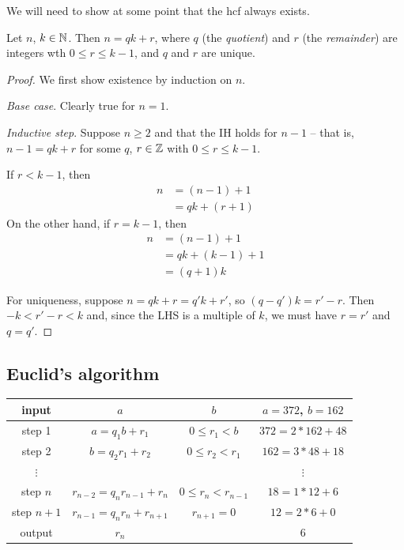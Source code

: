 \documentclass{../template/note}
\begin{document}
    We will need to show at some point that the hcf always exists.

    \begin{proposition}
        Let \(n\), \(k \in \mathbb N\). Then \(n = qk + r\), where \(q\) (the \emph{quotient}) and \(r\) (the \emph{remainder}) are integers wth \(0 \leq r \leq k-1\), and \(q\) and \(r\) are unique.
    \end{proposition}
    
    \begin{proof}
        We first show existence by induction on \(n\).

        \emph{Base case}. Clearly true for \(n=1\).

        \emph{Inductive step}. Suppose \(n \geq 2\) and that the IH holds for \(n-1\) -- that is, \(n-1=qk+r\) for some \(q\), \(r \in \mathbb Z\) with \(0 \leq r \leq k-1\).

        If \(r < k-1\), then
        \begin{align*}
            n &= (n-1) + 1 \\
            &= qk + (r + 1)
        \end{align*}
        On the other hand, if \(r = k-1\), then
        \begin{align*}
            n &= (n-1) + 1 \\
            &= qk + (k-1) + 1 \\
            &= (q+1)k
        \end{align*}

        For uniqueness, suppose \(n = qk + r = q'k + r'\), so \((q-q')k = r'-r\). Then \(-k < r'-r < k\) and, since the LHS is a multiple of \(k\), we must have \(r = r'\) and \(q = q'\).
    \end{proof}
    
    \subsection{Euclid's algorithm}

    \begin{center}
        \begin{tabular}{c | c c | c}
            input & \(a\) & \(b\) & \(a=372\), \(b=162\) \\
            \hline
            step 1 & \(a=q_1b + r_1\) & \(0 \leq r_1 < b\) & \(372 = 2 * 162 + 48\) \\
            step 2 & \(b=q_2r_1 + r_2\) & \(0 \leq r_2 < r_1\) & \(162 = 3 * 48 + 18\) \\
            \(\vdots\) & & & \(\vdots\) \\
            step \(n\) & \(r_{n-2}=q_nr_{n-1} + r_n\) & \(0 \leq r_n < r_{n-1}\) & \(18 = 1 * 12 + 6\) \\
            step \(n+1\) & \(r_{n-1}=q_nr_n + r_{n+1}\) & \(r_{n+1}=0\) & \(12 = 2 * 6 + 0\) \\
            \hline
            output & \(r_n\) & & 6
        \end{tabular}
        
        
    \end{center}
\end{document}
